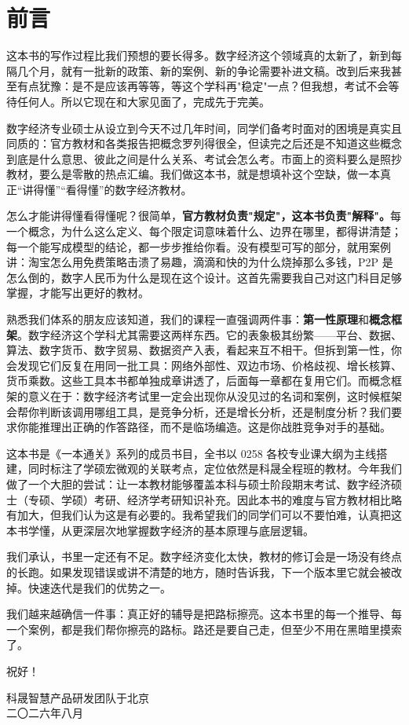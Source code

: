 \chapter*{前言}

这本书的写作过程比我们预想的要长得多。数字经济这个领域真的太新了，新到每隔几个月，就有一批新的政策、新的案例、新的争论需要补进文稿。改到后来我甚至有点犹豫：是不是应该再等等，等这个学科再"稳定"一点？但我想，考试不会等待任何人。所以它现在和大家见面了，完成先于完美。

数字经济专业硕士从设立到今天不过几年时间，同学们备考时面对的困境是真实且同质的：官方教材和各类报告把概念罗列得很全，但读完之后还是不知道这些概念到底是什么意思、彼此之间是什么关系、考试会怎么考。市面上的资料要么是照抄教材，要么是零散的热点汇编。我们做这本书，就是想填补这个空缺，做一本真正“讲得懂”“看得懂”的数字经济教材。

怎么才能讲得懂看得懂呢？很简单，\textbf{官方教材负责"规定"，这本书负责"解释"。}每一个概念，为什么这么定义、每个限定词意味着什么、边界在哪里，都得讲清楚；每一个能写成模型的结论，都一步步推给你看。没有模型可写的部分，就用案例讲：淘宝怎么用免费策略击溃了易趣，滴滴和快的为什么烧掉那么多钱，P2P 是怎么倒的，数字人民币为什么是现在这个设计。这首先需要我自己对这门科目足够掌握，才能写出更好的教材。

熟悉我们体系的朋友应该知道，我们的课程一直强调两件事：\textbf{第一性原理}和\textbf{概念框架}。数字经济这个学科尤其需要这两样东西。它的表象极其纷繁——平台、数据、算法、数字货币、数字贸易、数据资产入表，看起来互不相干。但拆到第一性，你会发现它们反复在用同一批工具：网络外部性、双边市场、价格歧视、增长核算、货币乘数。这些工具本书都单独成章讲透了，后面每一章都在复用它们。而概念框架的意义在于：数字经济考试里一定会出现你从没见过的名词和案例，这时候框架会帮你判断该调用哪组工具，是竞争分析，还是增长分析，还是制度分析？我们要求你能推理出正确的作答路径，而不是临场编造。这是你战胜竞争对手的基础。

这本书是《一本通关》系列的成员书目，全书以 0258 各校专业课大纲为主线搭建，同时标注了学硕宏微观的关联考点，定位依然是科晟全程班的教材。今年我们做了一个大胆的尝试：让一本教材能够覆盖本科与硕士阶段期末考试、数字经济硕士（专硕、学硕）考研、经济学考研知识补充。因此本书的难度与官方教材相比略有加大，但我们认为这是有必要的。我希望我们的同学们可以不要怕难，认真把这本书学懂，从更深层次地掌握数字经济的基本原理与底层逻辑。

我们承认，书里一定还有不足。数字经济变化太快，教材的修订会是一场没有终点的长跑。如果发现错误或讲不清楚的地方，随时告诉我，下一个版本里它就会被改掉。快速迭代是我们的优势之一。

我们越来越确信一件事：真正好的辅导是把路标擦亮。这本书里的每一个推导、每一个案例，都是我们帮你擦亮的路标。路还是要自己走，但至少不用在黑暗里摸索了。

祝好！

\begin{flushright}
科晟智慧产品研发团队\quad 于北京\\
二〇二六年八月
\end{flushright}
